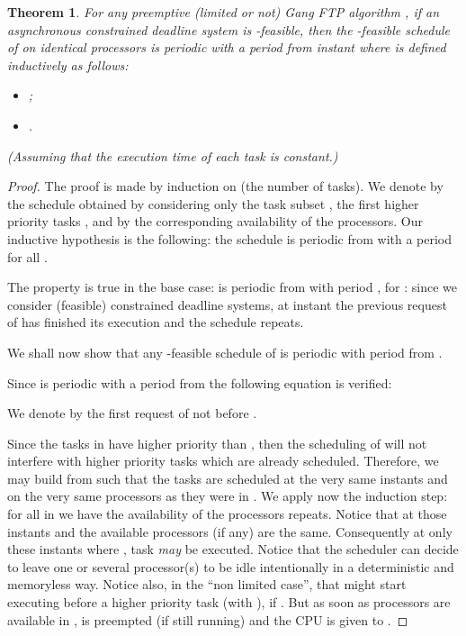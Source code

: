\documentclass[a4paper]{article}
\newtheorem{theorem}{Theorem}
\begin{document}
\begin{theorem}\label{thm:asynPer} For any preemptive (limited or not) Gang FTP algorithm , if an asynchronous constrained deadline system  is -feasible, then the -feasible schedule of  on  identical processors is periodic with a period  from instant  where  is defined inductively as follows:

  \begin{itemize}
  \item ; 
  \item .
  \end{itemize}
  
  (Assuming that the execution time of each task is constant.)
\end{theorem}

\begin{proof}
  The proof is made by induction on  (the number of tasks). We denote by  the schedule obtained by considering only the task subset , the first higher priority  tasks , and by  the corresponding availability of the processors. Our inductive hypothesis is the following: the schedule  is periodic from  with a period  for all .

  The property is true in the base case:  is periodic from  with period , for :  since we consider (feasible) constrained deadline systems, at instant  the  previous request of  has finished its execution and the  schedule repeats.

  We shall now show that any -feasible schedule of  is  periodic with period  from .

  Since  is periodic with a period  from  the  following equation is verified:



We denote by  the first request of  not before .

Since the tasks in  have higher priority than , then the scheduling of  will not interfere with higher priority tasks which are already scheduled. Therefore, we may build  from  such that the tasks  are scheduled at the very same instants and on the very same processors as they were in . We apply now the induction step: for all  in  we have  the availability of the processors repeats. Notice that at those instants  and  the available processors (if any) are the same. Consequently at only these instants where , task  {\em may} be executed. Notice that the scheduler can decide to leave one or several processor(s) to be idle intentionally in a deterministic and memoryless way. Notice also, in the ``non limited case'', that  might start executing before a higher priority task  (with ), if . But as soon as  processors are available in ,  is preempted (if still running) and the CPU is given to .  


\end{proof}
\end{document}
